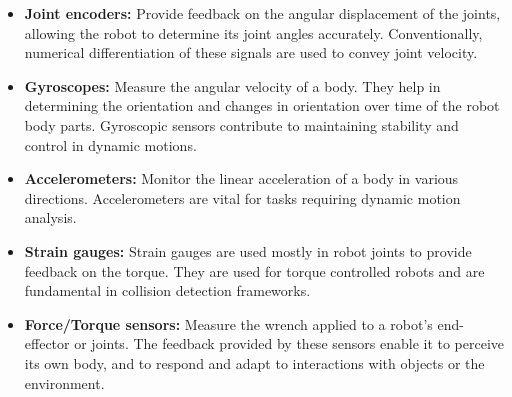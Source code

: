 \begin{itemize}
	\item \textbf{Joint encoders:} %
	Provide feedback on the angular displacement of the joints, allowing the robot to determine its joint angles accurately. Conventionally, numerical differentiation of these signals are used to convey joint velocity.
	
	\item \textbf{Gyroscopes:} Measure the angular velocity of a body. They help in determining the orientation and changes in orientation over time of the robot body parts. Gyroscopic sensors contribute to maintaining stability and control in dynamic motions.
	
	\item \textbf{Accelerometers:} Monitor the linear acceleration of a body in various directions. Accelerometers are vital for tasks requiring dynamic motion analysis.
	
	
	\item \textbf{Strain gauges:} Strain gauges are used mostly in robot joints to provide feedback on the torque. They are used for torque controlled robots and are fundamental in collision detection frameworks.
	
	\item \textbf{Force/Torque sensors:} Measure the wrench applied to a robot's end-effector or joints. The feedback provided by these sensors enable it to perceive its own body, and to respond and adapt to interactions with objects or the environment.
	
	
	
	
\end{itemize}
